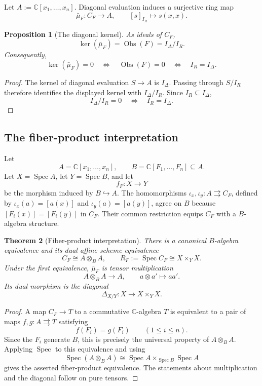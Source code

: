 \documentclass[11pt]{article}
\newtheorem{theorem}{Theorem}[section]
\newtheorem{proposition}[theorem]{Proposition}
\theoremstyle{remark}
\theoremstyle{definition}
\DeclareMathOperator{\Spec}{Spec}
\newcommand{\C}{\mathbb C}
\newcommand{\Obs}{\operatorname{Obs}}
\begin{document}
Let \(A:=\C[x_1,\dots,x_n]\).  Diagonal evaluation induces a surjective ring
map
\[
  \bar\mu_F\colon C_F\longrightarrow A,
  \qquad
  [s]_{I_R}\longmapsto s(x,x).
\]

\begin{proposition}[The diagonal kernel]
\label{prop:obstruction-kernel}
As ideals of \(C_F\),
\[
  \ker(\bar\mu_F)
  =
  \Obs(F)
  =
  I_\Delta/I_R.
\]
Consequently,
\[
  \ker(\bar\mu_F)=0
  \quad\Longleftrightarrow\quad
  \Obs(F)=0
  \quad\Longleftrightarrow\quad
  I_R=I_\Delta.
\]
\end{proposition}

\begin{proof}
The kernel of diagonal evaluation \(S\to A\) is \(I_\Delta\).  Passing
through \(S/I_R\) therefore identifies the displayed kernel with
\(I_\Delta/I_R\).  Since \(I_R\subseteq I_\Delta\),
\[
  I_\Delta/I_R=0
  \quad\Longleftrightarrow\quad
  I_R=I_\Delta.
\]
\end{proof}

\subsection{The fiber-product interpretation}
\label{sec:fiber-product}

Let
\[
  A=\C[x_1,\dots,x_n],\qquad
  B=\C[F_1,\dots,F_n]\subseteq A.
\]
Let \(X=\Spec A\), let \(Y=\Spec B\), and let
\[
  f_F\colon X\longrightarrow Y
\]
be the morphism induced by \(B\hookrightarrow A\).
The homomorphisms
\(\iota_x,\iota_y\colon A\rightrightarrows C_F\), defined by
\(\iota_x(a)=[a(x)]\) and \(\iota_y(a)=[a(y)]\), agree on \(B\) because
\([F_i(x)]=[F_i(y)]\) in \(C_F\).  Their common restriction equips
\(C_F\) with a \(B\)-algebra structure.

\begin{theorem}[Fiber-product interpretation]
\label{thm:collision-tensor-product}
There is a canonical \(B\)-algebra equivalence and its dual
affine-scheme equivalence
\[
  C_F\cong A\otimes_B A,
  \qquad
  R_F:=\Spec C_F\cong X\times_YX.
\]
Under the first equivalence, \(\bar\mu_F\) is tensor multiplication
\[
  A\otimes_BA\longrightarrow A,\qquad a\otimes a'\longmapsto aa'.
\]
Its dual morphism is the diagonal
\[
  \Delta_{X/Y}\colon X\longrightarrow X\times_YX.
\]
\end{theorem}

\begin{proof}
A map \(C_F\to T\) to a commutative \(\C\)-algebra \(T\) is equivalent
to a pair of maps \(f,g\colon A\rightrightarrows T\) satisfying
\[
  f(F_i)=g(F_i)\qquad(1\leq i\leq n).
\]
Since the \(F_i\) generate \(B\), this is precisely the universal
property of \(A\otimes_BA\).  Applying \(\Spec\) to this equivalence and
using
\[
  \Spec(A\otimes_BA)
  \cong
  \Spec A\times_{\Spec B}\Spec A
\]
gives the asserted fiber-product equivalence.
The statements about multiplication and the diagonal follow on pure
tensors.
\end{proof}
\end{document}

